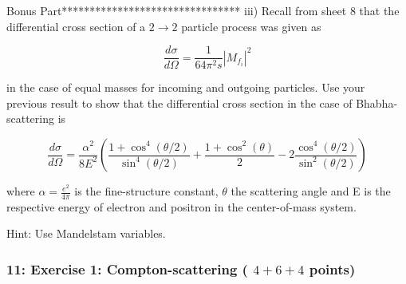 \documentclass[10pt, letterpaper]{article}
\begin{document}
Bonus Part********************************
iii) Recall from sheet 8 that the differential cross section of a $2 \rightarrow 2$ particle process was given as

$$
\frac{d \sigma}{d \Omega}=\frac{1}{64 \pi^2 s}\left|M_{f_i}\right|^2
$$

in the case of equal masses for incoming and outgoing particles. Use your previous result to show that the differential cross section in the case of Bhabha-scattering is

$$
\frac{d \sigma}{d \Omega}=\frac{\alpha^2}{8 E^2}\left(\frac{1+\cos ^4(\theta / 2)}{\sin ^4(\theta / 2)}+\frac{1+\cos ^2(\theta)}{2}-2 \frac{\cos ^4(\theta / 2)}{\sin ^2(\theta / 2)}\right)
$$

where $\alpha=\frac{e^2}{4 \pi}$ is the fine-structure constant, $\theta$ the scattering angle and E is the respective energy of electron and positron in the center-of-mass system.

Hint: Use Mandelstam variables.


\subsubsection{11: Exercise 1: Compton-scattering ( $4+6+4$ points)}
\end{document}

